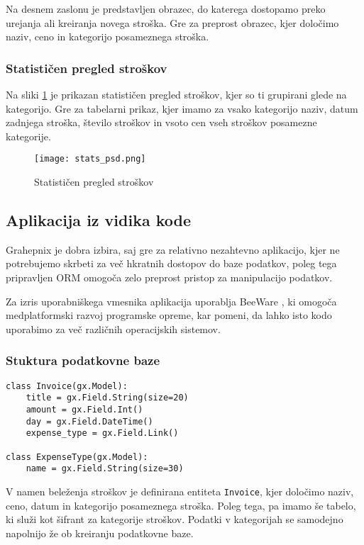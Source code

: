 \documentclass[a4paper,12pt,openright]{book}
\begin{document}
    Na desnem zaslonu je predstavljen obrazec, do katerega dostopamo preko urejanja ali kreiranja novega stroška. Gre za preprost obrazec, kjer določimo naziv, ceno in kategorijo posameznega stroška.

    \subsubsection{Statističen pregled stroškov}
    Na sliki \ref{stats_screen} je prikazan statističen pregled stroškov, kjer so ti grupirani glede na kategorijo. Gre za tabelarni prikaz, kjer imamo za vsako kategorijo naziv, datum zadnjega stroška, število stroškov in vsoto cen vseh stroškov posamezne kategorije.

    \begin{figure}[H]
        \centerline{\texttt{[image: stats\_psd.png]}}
        \caption{Statističen pregled stroškov}
        \label{stats_screen}
    \end{figure}

    \subsection{Aplikacija iz vidika kode}

    Grahepnix je dobra izbira, saj gre za relativno nezahtevno aplikacijo, kjer ne potrebujemo skrbeti za več hkratnih dostopov do baze podatkov, poleg tega pripravljen ORM omogoča zelo preprost pristop za manipulacijo podatkov.

    Za izris uporabniškega vmesnika aplikacija uporablja BeeWare \cite{BEE_WARE}, ki omogoča medplatformski razvoj programske opreme, kar pomeni, da lahko isto kodo uporabimo za več različnih operacijskih sistemov.

    \subsubsection{Stuktura podatkovne baze}

\begin{verbatim}
class Invoice(gx.Model):
    title = gx.Field.String(size=20)
    amount = gx.Field.Int()
    day = gx.Field.DateTime()
    expense_type = gx.Field.Link()

class ExpenseType(gx.Model):
    name = gx.Field.String(size=30)
\end{verbatim}

    \noindent
    V namen beleženja stroškov je definirana entiteta {\tt Invoice}, kjer določimo naziv, ceno, datum in kategorijo posameznega stroška.
    Poleg tega, pa imamo še tabelo, ki služi kot šifrant za kategorije stroškov. Podatki v kategorijah se samodejno napolnijo že ob kreiranju podatkovne baze.
\end{document}
